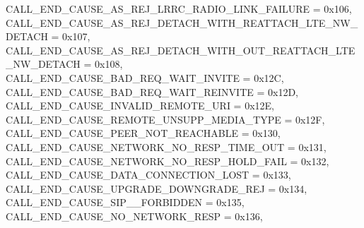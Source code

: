 \begin{DoxyItemize}
 C\+A\+L\+L\+\_\+\+E\+N\+D\+\_\+\+C\+A\+U\+S\+E\+\_\+\+A\+S\+\_\+\+R\+E\+J\+\_\+\+L\+R\+R\+C\+\_\+\+R\+A\+D\+I\+O\+\_\+\+L\+I\+N\+K\+\_\+\+F\+A\+I\+L\+U\+RE = 0x106,~\newline
 C\+A\+L\+L\+\_\+\+E\+N\+D\+\_\+\+C\+A\+U\+S\+E\+\_\+\+A\+S\+\_\+\+R\+E\+J\+\_\+\+D\+E\+T\+A\+C\+H\+\_\+\+W\+I\+T\+H\+\_\+\+R\+E\+A\+T\+T\+A\+C\+H\+\_\+\+L\+T\+E\+\_\+\+N\+W\+\_\+\+D\+E\+T\+A\+CH = 0x107,~\newline
 C\+A\+L\+L\+\_\+\+E\+N\+D\+\_\+\+C\+A\+U\+S\+E\+\_\+\+A\+S\+\_\+\+R\+E\+J\+\_\+\+D\+E\+T\+A\+C\+H\+\_\+\+W\+I\+T\+H\+\_\+\+O\+U\+T\+\_\+\+R\+E\+A\+T\+T\+A\+C\+H\+\_\+\+L\+T\+E\+\_\+\+N\+W\+\_\+\+D\+E\+T\+A\+CH = 0x108,~\newline
 C\+A\+L\+L\+\_\+\+E\+N\+D\+\_\+\+C\+A\+U\+S\+E\+\_\+\+B\+A\+D\+\_\+\+R\+E\+Q\+\_\+\+W\+A\+I\+T\+\_\+\+I\+N\+V\+I\+TE = 0x12C,~\newline
 C\+A\+L\+L\+\_\+\+E\+N\+D\+\_\+\+C\+A\+U\+S\+E\+\_\+\+B\+A\+D\+\_\+\+R\+E\+Q\+\_\+\+W\+A\+I\+T\+\_\+\+R\+E\+I\+N\+V\+I\+TE = 0x12D,~\newline
 C\+A\+L\+L\+\_\+\+E\+N\+D\+\_\+\+C\+A\+U\+S\+E\+\_\+\+I\+N\+V\+A\+L\+I\+D\+\_\+\+R\+E\+M\+O\+T\+E\+\_\+\+U\+RI = 0x12E,~\newline
 C\+A\+L\+L\+\_\+\+E\+N\+D\+\_\+\+C\+A\+U\+S\+E\+\_\+\+R\+E\+M\+O\+T\+E\+\_\+\+U\+N\+S\+U\+P\+P\+\_\+\+M\+E\+D\+I\+A\+\_\+\+T\+Y\+PE = 0x12F,~\newline
 C\+A\+L\+L\+\_\+\+E\+N\+D\+\_\+\+C\+A\+U\+S\+E\+\_\+\+P\+E\+E\+R\+\_\+\+N\+O\+T\+\_\+\+R\+E\+A\+C\+H\+A\+B\+LE = 0x130,~\newline
 C\+A\+L\+L\+\_\+\+E\+N\+D\+\_\+\+C\+A\+U\+S\+E\+\_\+\+N\+E\+T\+W\+O\+R\+K\+\_\+\+N\+O\+\_\+\+R\+E\+S\+P\+\_\+\+T\+I\+M\+E\+\_\+\+O\+UT = 0x131,~\newline
 C\+A\+L\+L\+\_\+\+E\+N\+D\+\_\+\+C\+A\+U\+S\+E\+\_\+\+N\+E\+T\+W\+O\+R\+K\+\_\+\+N\+O\+\_\+\+R\+E\+S\+P\+\_\+\+H\+O\+L\+D\+\_\+\+F\+A\+IL = 0x132,~\newline
 C\+A\+L\+L\+\_\+\+E\+N\+D\+\_\+\+C\+A\+U\+S\+E\+\_\+\+D\+A\+T\+A\+\_\+\+C\+O\+N\+N\+E\+C\+T\+I\+O\+N\+\_\+\+L\+O\+ST = 0x133,~\newline
 C\+A\+L\+L\+\_\+\+E\+N\+D\+\_\+\+C\+A\+U\+S\+E\+\_\+\+U\+P\+G\+R\+A\+D\+E\+\_\+\+D\+O\+W\+N\+G\+R\+A\+D\+E\+\_\+\+R\+EJ = 0x134,~\newline
 C\+A\+L\+L\+\_\+\+E\+N\+D\+\_\+\+C\+A\+U\+S\+E\+\_\+\+S\+I\+P\+\_\+\_\+\+F\+O\+R\+B\+I\+D\+D\+EN = 0x135,~\newline
 C\+A\+L\+L\+\_\+\+E\+N\+D\+\_\+\+C\+A\+U\+S\+E\+\_\+\+N\+O\+\_\+\+N\+E\+T\+W\+O\+R\+K\+\_\+\+R\+E\+SP = 0x136,~\newline

\end{DoxyItemize}
